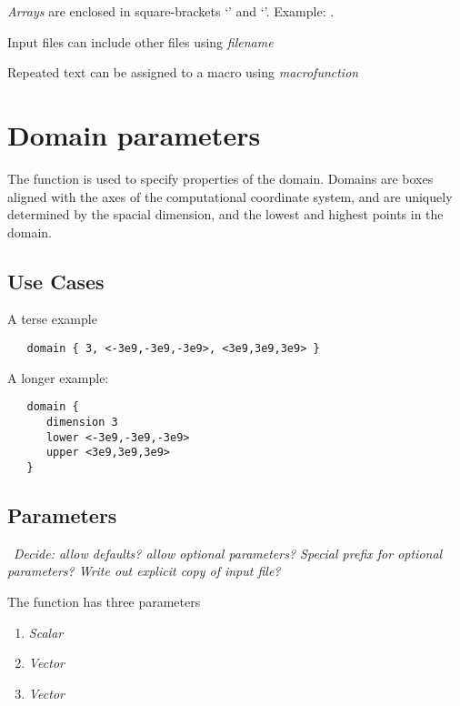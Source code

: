 \documentclass{book}
\begin{document}
\textit{Arrays} are enclosed in square-brackets `\code{[}' and `\code{]}'.  Example: \code{[3e9,$<$3,4,5$>$, "density"]}.

Input files can include other files using \textit{filename}

Repeated text can be assigned to a macro using \textit{macro}\code{ = }\textit{function}

\section{Domain parameters} \label{s:domain}

The  function is used to specify properties of the
domain.  Domains are boxes aligned with the axes of the computational
coordinate system, and are uniquely determined by the spacial
dimension, and the lowest and highest points in the domain.

\subsection{Use Cases}

A terse example
\begin{verbatim}
   domain { 3, <-3e9,-3e9,-3e9>, <3e9,3e9,3e9> }
\end{verbatim}

A longer example:
\begin{verbatim}
   domain { 
      dimension 3
      lower <-3e9,-3e9,-3e9>
      upper <3e9,3e9,3e9>
   }
\end{verbatim}

\subsection{Parameters}

 \todo\ \textit{Decide: allow defaults?  allow optional parameters?  Special
  prefix for optional parameters?  Write out explicit copy
 of input file?}

The  function has three parameters
\begin{enumerate}
\item \textit{Scalar} 
\item \textit{Vector} 
\item \textit{Vector} 
\end{enumerate}
\end{document}
